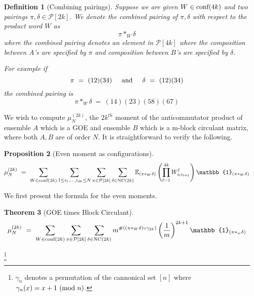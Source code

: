 \documentclass[12pt,reqno]{amsart}
\theoremstyle{plain} %
\newtheorem{theorem}{Theorem}[section]
\newtheorem{prop}[theorem]{Proposition}
\newtheorem{definition}[theorem]{Definition}
\theoremstyle{remark}
\theoremstyle{definition}
\renewcommand{\mod}[1]{\textup{ (mod~$#1$)}}
\begin{document}
\begin{definition}[Combining pairings]
    Suppose we are given $W \in \textnormal{conf}(4k)$ and two pairings 
    $\pi, \delta \in \mathcal{P}[2k]$. We denote the 
    combined pairing of $\pi, \delta$ with respect 
    to the product word $W$ as 
    \[
        \pi *_W \delta
    \]
    where the combined pairing denotes an element in $\mathcal{P}[4k]$ 
    where the composition between $A$'s are specified by $\pi$ and 
    composition between $B$'s are specified by $\delta$. 

    For example if 
    \[
    \pi \ = \ (1 2) (3 4) { \hspace{5mm} \textrm{and} \hspace{5mm} } 
    \delta \ = \ (12) (34)
    \]
    the combined pairing is 
    \[
    \pi *_W \delta \ = \ (1 4)(2 3)(5 8)(67)
    \]
\end{definition}
    


We wish to compute $\mu_N^{(2k)}$, the $2k^{th}$ moment of 
the anticommutator product of ensemble $A$ which is a GOE 
and ensemble $B$ which is a m-block circulant matrix, 
where both $A, B$ are of order $N$. It is straightforward to 
verify the following. 

\begin{prop}[Even moment as configurations]
    \label{thm:baseForm}
    \begin{equation}
        \mu_N^{(2k)} \ = \ 
        \sum_{W\in \PW(2k)}
        \sum_{1 \leq i_1 , \dots, i_{4k} \leq N}
        \sum_{\pi \in \mathcal P[2k]}  
        \sum_{\delta \in \NC(2k)}  
        \mathbb{E}_{(\pi*_W\delta)}\left(
        \prod_{l = 1}^{4k} W^{l}_{i_l i_{l + 1}}
        \right) \mathbb{1}_{(\pi*_W\delta)}
    \end{equation}
\end{prop}

We first present the formula for the even moments. 

\begin{theorem}[GOE times Block Circulant]
    \label{thm: GOEBC}
    \begin{equation}
        \mu_N^{(2k)} \ = \ 
        \sum_{W \in \PW(2k)}
        \sum_{\pi \in \mathcal P[2k]}  
        \sum_{\delta \in \NC(2k)}   
        m^{
            \#((\pi *_W \delta) \circ \gamma_{2k} )
        }
        \left(
            \frac 1 m
        \right)^{2k + 1}
        \mathbb{1}_{(\pi*_w\delta)}
    \end{equation}
\end{theorem}
\footnote{
    $\gamma_n$ denotes a permutation of the cannonical set $[n]$ 
    where $\gamma_n(x) = x + 1 \mod n$. 
}
\end{document}
